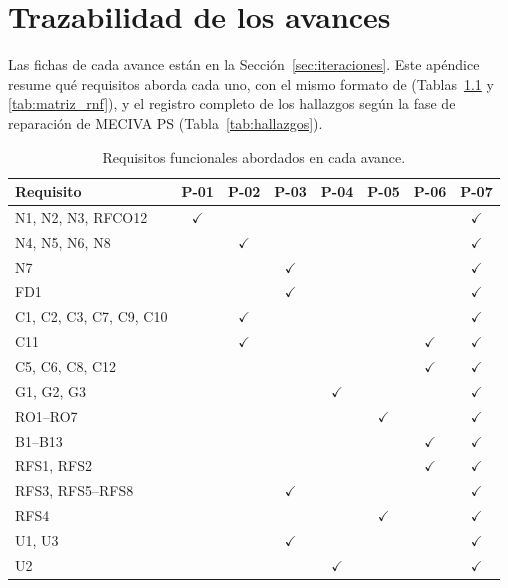 
\chapter{Trazabilidad de los avances}
\label{ap:avances}

Las fichas de cada avance están en la Sección~\ref{sec:iteraciones}. Este apéndice resume qué requisitos aborda cada uno, con el mismo formato de \citet{figueroa2025arquitectura} (Tablas~\ref{tab:matriz_rf} y \ref{tab:matriz_rnf}), y el registro completo de los hallazgos según la fase de reparación de MECIVA PS (Tabla~\ref{tab:hallazgos}).

\newcommand{\avsi}{$\checkmark$}
\begin{table}[H]
\centering
\caption{Requisitos funcionales abordados en cada avance.}
\label{tab:matriz_rf}
\footnotesize
\begin{tabular}{l c c c c c c c}
\toprule
Requisito & P-01 & P-02 & P-03 & P-04 & P-05 & P-06 & P-07 \\ \midrule
N1, N2, N3, RFCO12 & \avsi & & & & & & \avsi \\
N4, N5, N6, N8 & & \avsi & & & & & \avsi \\
N7 & & & \avsi & & & & \avsi \\
FD1 & & & \avsi & & & & \avsi \\
C1, C2, C3, C7, C9, C10 & & \avsi & & & & & \avsi \\
C11 & & \avsi & & & & \avsi & \avsi \\
C5, C6, C8, C12 & & & & & & \avsi & \avsi \\
G1, G2, G3 & & & & \avsi & & & \avsi \\
RO1--RO7 & & & & & \avsi & & \avsi \\
B1--B13 & & & & & & \avsi & \avsi \\
RFS1, RFS2 & & & & & & \avsi & \avsi \\
RFS3, RFS5--RFS8 & & & \avsi & & & & \avsi \\
RFS4 & & & & & \avsi & & \avsi \\
U1, U3 & & & \avsi & & & & \avsi \\
U2 & & & & \avsi & & & \avsi \\ \bottomrule
\end{tabular}
\end{table}

